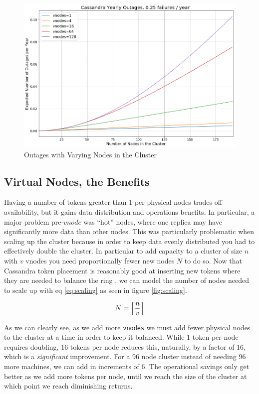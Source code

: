 \documentclass{article}
\DeclarePairedDelimiter{\ceil}{\lceil}{\rceil}
\begin{document}
\begin{figure}[H]
    \centering
    \includegraphics[width=1.0\textwidth]{images/outages_nodes.png}
    \caption{Outages with Varying Nodes in the Cluster}
    \label{fig:outages_nodes}
\end{figure}


\subsection{Virtual Nodes, the Benefits}
Having a number of tokens greater than 1 per physical nodes trades off availability, but it gains data distribution and operations benefits. In particular, a major problem pre-$vnode$ was ``hot'' nodes, where one replica may have significantly more data than other nodes. This was particularly problematic when scaling up the cluster because in order to keep data evenly distributed you had to effectively double the cluster. In particular to add capacity to a cluster of size $n$ with $v$ vnodes you need proportionally fewer new nodes $N$ to do so. Now that Cassandra token placement is reasonably good at inserting new tokens where they are needed to balance the ring \cite{tokenallocation}, we can model the number of nodes needed to scale up with eq \ref{eq:scaling} as seen in figure \ref{fig:scaling}.

\begin{equation} \label{eq:scaling}
    N = \ceil*{\frac{n}{v}}
\end{equation}

As we can clearly see, as we add more \texttt{vnodes} we must add fewer physical nodes to the cluster at a time in order to keep it balanced. While 1 token per node requires doubling, 16 tokens per node reduces this, naturally, by a factor of 16, which is a \textit{significant} improvement. For a 96 node cluster instead of needing 96 more machines, we can add in increments of 6. The operational savings only get better as we add more tokens per node, until we reach the size of the cluster at which point we reach diminishing returns.
\end{document}

